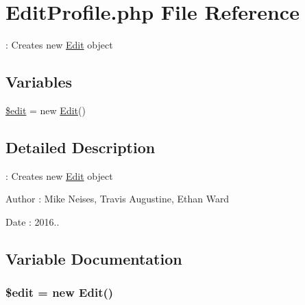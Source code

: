 \hypertarget{_edit_profile_8php}{}\section{Edit\+Profile.\+php File Reference}
\label{_edit_profile_8php}


\+: Creates new \hyperlink{class_edit}{Edit} object  


\subsection*{Variables}
\begin{DoxyCompactItemize}
\item 
\hyperlink{_edit_profile_8php_a5b4e1531e369399faa047daed66816e7}{\$edit} = new \hyperlink{class_edit}{Edit}()
\end{DoxyCompactItemize}


\subsection{Detailed Description}
\+: Creates new \hyperlink{class_edit}{Edit} object 

\begin{DoxyAuthor}{Author}
\+: Mike Neises, Travis Augustine, Ethan Ward 
\end{DoxyAuthor}
\begin{DoxyDate}{Date}
\+: 2016.. 
\end{DoxyDate}


\subsection{Variable Documentation}
\subsubsection[{\texorpdfstring{\$edit}{$edit}}]{\setlength{\rightskip}{0pt plus 5cm}\$edit = new {\bf Edit}()}\hypertarget{_edit_profile_8php_a5b4e1531e369399faa047daed66816e7}{}\label{_edit_profile_8php_a5b4e1531e369399faa047daed66816e7}
